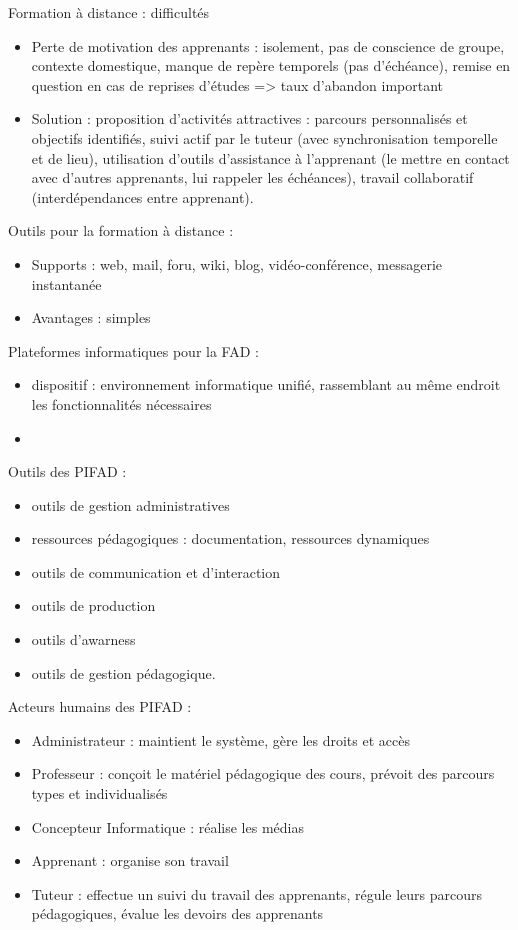Formation à distance : difficultés
\begin{itemize}
	\item Perte de motivation des apprenants : isolement, pas de conscience de groupe, contexte domestique, manque de repère temporels (pas d'échéance), remise en question en cas de reprises d'études => taux d'abandon important
	\item Solution : proposition d'activités attractives : parcours personnalisés et objectifs identifiés, suivi actif par le tuteur (avec synchronisation temporelle et de lieu), utilisation d'outils d'assistance à l'apprenant (le mettre en contact avec d'autres apprenants, lui rappeler les échéances), travail collaboratif (interdépendances entre apprenant).
\end{itemize}

\vskip 1cm

Outils pour la formation à distance :
\begin{itemize}
	\item Supports : web, mail, foru, wiki, blog, vidéo-conférence, messagerie instantanée
	\item Avantages : simples
\end{itemize}

Plateformes informatiques pour la FAD :
\begin{itemize}
	\item  dispositif : environnement informatique unifié, rassemblant au même endroit les fonctionnalités nécessaires
	\item 
\end{itemize}

Outils des PIFAD :
\begin{itemize}
	\item outils de gestion administratives
	\item ressources pédagogiques : documentation, ressources dynamiques
	\item outils de communication et d'interaction
	\item outils de production
	\item outils d'awarness
	\item outils de gestion pédagogique.
\end{itemize}

Acteurs humains des PIFAD :
\begin{itemize}
	\item Administrateur : maintient le système, gère les droits et accès
	\item Professeur : conçoit le matériel pédagogique des cours, prévoit des parcours types et individualisés
	\item Concepteur Informatique : réalise les médias
	\item Apprenant : organise son travail
	\item Tuteur : effectue un suivi du travail des apprenants, régule leurs parcours pédagogiques, évalue les devoirs des apprenants
\end{itemize}

